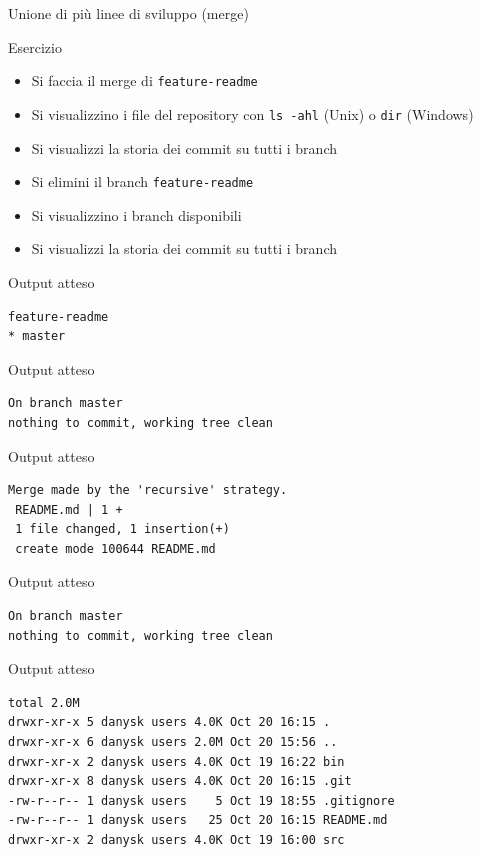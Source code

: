 \documentclass[xcolor=dvipsnames,presentation]{beamer}
\begin{document}
\begin{frame}{Unione di più linee di sviluppo (merge)}
\begin{block}{Esercizio}
\begin{itemize}
			\item Si faccia il merge di \texttt{feature-readme}
			\item Si visualizzino i file del repository con \texttt{ls -ahl} (Unix) o \texttt{dir} (Windows)
			\item Si visualizzi la storia dei commit su tutti i branch
			\item Si elimini il branch \texttt{feature-readme}
			\item Si visualizzino i branch disponibili
			\item Si visualizzi la storia dei commit su tutti i branch
		\end{itemize}
	\end{block}
	\begin{block}{Output atteso}
		\begin{Verbatim}[fontsize=\scriptsize]
  feature-readme
* master
		\end{Verbatim}
	\end{block}
	\begin{block}{Output atteso}
		\begin{Verbatim}[fontsize=\scriptsize]
On branch master
nothing to commit, working tree clean
		\end{Verbatim}
	\end{block}
	\begin{block}{Output atteso}
		\begin{Verbatim}[fontsize=\scriptsize]
Merge made by the 'recursive' strategy.
 README.md | 1 +
 1 file changed, 1 insertion(+)
 create mode 100644 README.md
		\end{Verbatim}
	\end{block}
	\begin{block}{Output atteso}
		\begin{Verbatim}[fontsize=\scriptsize]
On branch master
nothing to commit, working tree clean
		\end{Verbatim}
	\end{block}
	\begin{block}{Output atteso}
		\begin{Verbatim}[fontsize=\scriptsize]
total 2.0M
drwxr-xr-x 5 danysk users 4.0K Oct 20 16:15 .
drwxr-xr-x 6 danysk users 2.0M Oct 20 15:56 ..
drwxr-xr-x 2 danysk users 4.0K Oct 19 16:22 bin
drwxr-xr-x 8 danysk users 4.0K Oct 20 16:15 .git
-rw-r--r-- 1 danysk users    5 Oct 19 18:55 .gitignore
-rw-r--r-- 1 danysk users   25 Oct 20 16:15 README.md
drwxr-xr-x 2 danysk users 4.0K Oct 19 16:00 src
		\end{Verbatim}
	\end{block}

\end{frame}
\end{document}
